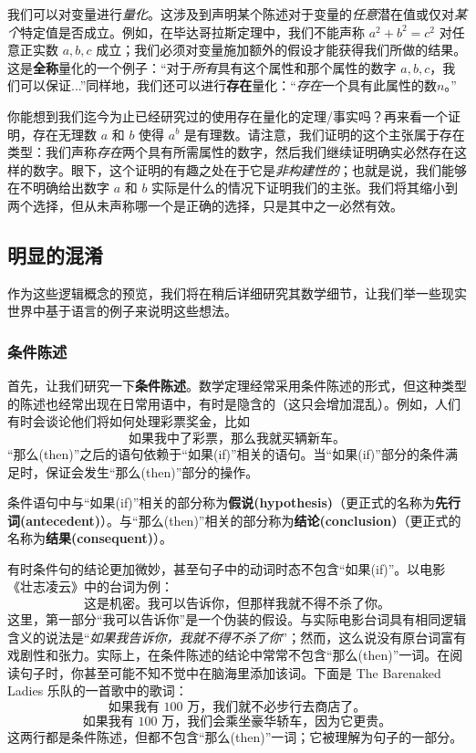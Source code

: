 我们可以对变量进行\textit{量化}。这涉及到声明某个陈述对于变量的\textit{任意}潜在值或仅对\textit{某个}特定值是否成立。例如，在毕达哥拉斯定理中，我们不能声称 $a^2+b^2=c^2$ 对任意正实数 $a,b,c$ 成立；我们必须对变量施加额外的假设才能获得我们所做的结果。这是\textbf{全称}量化的一个例子：“对于\textit{所有}具有这个属性和那个属性的数字 $a,b,c$，我们可以保证...”同样地，我们还可以进行\textbf{存在}量化：“\textit{存在}一个具有此属性的数$n$。”

你能想到我们迄今为止已经研究过的使用存在量化的定理/事实吗？再来看一个证明，存在无理数 $a$ 和 $b$ 使得 $a^b$ 是有理数。请注意，我们证明的这个主张属于存在类型：我们声称\textit{存在}两个具有所需属性的数字，然后我们继续证明确实必然存在这样的数字。眼下，这个证明的有趣之处在于它是\textit{非构建性的}；也就是说，我们能够在不明确给出数字 $a$ 和 $b$ 实际是什么的情况下证明我们的主张。我们将其缩小到两个选择，但从未声称哪一个是正确的选择，只是其中之一必然有效。

\subsection{明显的混淆}

作为这些逻辑概念的预览，我们将在稍后详细研究其数学细节，让我们举一些现实世界中基于语言的例子来说明这些想法。

\subsubsection*{条件陈述}

首先，让我们研究一下\textbf{条件陈述}。数学定理经常采用条件陈述的形式，但这种类型的陈述也经常出现在日常用语中，有时是隐含的（这只会增加混乱）。例如，人们有时会谈论他们将如何处理彩票奖金，比如
\[\text{如果我中了彩票，那么我就买辆新车。}\]
“那么(then)”之后的语句依赖于“如果(if)”相关的语句。当“如果(if)”部分的条件满足时，保证会发生“那么(then)”部分的操作。

条件语句中与“如果(if)”相关的部分称为\textbf{假说(hypothesis)}（更正式的名称为\textbf{先行词(antecedent)}）。与“那么(then)”相关的部分称为\textbf{结论(conclusion)}（更正式的名称为\textbf{结果(consequent)}）。

有时条件句的结论更加微妙，甚至句子中的动词时态不包含“如果(if)”。以电影《壮志凌云》中的台词为例：
\[\text{这是机密。我可以告诉你，但那样我就不得不杀了你。}\]
这里，第一部分“我可以告诉你”是一个伪装的假设。与实际电影台词具有相同逻辑含义的说法是“\textit{如果我告诉你，我就不得不杀了你}”；然而，这么说没有原台词富有戏剧性和张力。实际上，在条件陈述的结论中常常不包含“那么(then)”一词。在阅读句子时，你甚至可能不知不觉中在脑海里添加该词。下面是 The Barenaked Ladies 乐队的一首歌中的歌词：
\[\text{如果我有 100 万，我们就不必步行去商店了。}\]
\[\text{如果我有 100 万，我们会乘坐豪华轿车，因为它更贵。}\]
这两行都是条件陈述，但都不包含“那么(then)”一词；它被理解为句子的一部分。

